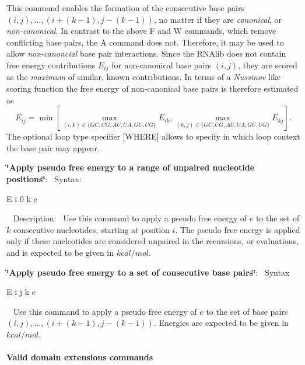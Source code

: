 \begin{DoxyEnumerate}
 This command enables the formation of the consecutive base pairs $ (i,j), \ldots, (i+(k-1), j-(k-1)) $, no matter if they are {\itshape canonical}, or {\itshape non-\/canonical}. In contrast to the above {\ttfamily F} and {\ttfamily W} commands, which remove conflicting base pairs, the {\ttfamily A} command does not. Therefore, it may be used to allow {\itshape non-\/canoncial} base pair interactions. Since the R\+N\+Alib does not contain free energy contributions $ E_{ij} $ for non-\/canonical base pairs $ (i,j) $, they are scored as the {\itshape maximum} of similar, known contributions. In terms of a {\itshape Nussinov} like scoring function the free energy of non-\/canonical base pairs is therefore estimated as \[ E_{ij} = \min \left[ \max_{(i,k) \in \{GC, CG, AU, UA, GU, UG\}} E_{ik}, \max_{(k,j) \in \{GC, CG, AU, UA, GU, UG\}} E_{kj} \right]. \] The optional loop type specifier {\ttfamily }\mbox{[}W\+H\+E\+RE\mbox{]} allows to specify in which loop context the base pair may appear.
\item {\bfseries \char`\"{}\+Apply pseudo free energy to a range of unpaired nucleotide positions\char`\"{}}\+:~\newline
 Syntax\+:
\begin{DoxyCode}
E i 0 k e 
\end{DoxyCode}
~\newline
 Description\+:~\newline
 Use this command to apply a pseudo free energy of $ e $ to the set of $ k $ consecutive nucleotides, starting at position $ i $. The pseudo free energy is applied only if these nucleotides are considered unpaired in the recursions, or evaluations, and is expected to be given in $ kcal / mol $.
\item {\bfseries \char`\"{}\+Apply pseudo free energy to a set of consecutive base pairs\char`\"{}}\+:~\newline
 Syntax
\begin{DoxyCode}
E i j k e 
\end{DoxyCode}
~\newline
 Use this command to apply a pseudo free energy of $ e $ to the set of base pairs $ (i,j), \ldots, (i+(k-1), j-(k-1)) $. Energies are expected to be given in $ kcal / mol $.
\end{DoxyEnumerate}\hypertarget{file_formats_domains_syntax}{}\paragraph{Valid domain extensions commands}\label{file_formats_domains_syntax}

